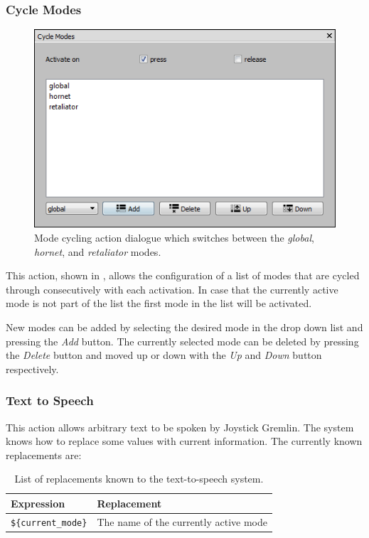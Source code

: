 \documentclass[a4, 10pt]{article}
\newcommand{\JG}{Joystick Gremlin}
\begin{document}
\subsubsection{Cycle Modes}

\begin{figure}[bt]
    \centering

    \includegraphics[width=0.75\linewidth]{images/action_cycle_modes}
    \caption{Mode cycling action dialogue which switches between the
        \emph{global}, \emph{hornet}, and \emph{retaliator} modes.}
    \label{fig:action_cycle_modes}
\end{figure}

This action, shown in , allows the
configuration of a list of modes that are cycled through consecutively
with each activation. In case that the currently active mode is not part
of the list the first mode in the list will be activated.

New modes can be added by selecting the desired mode in the drop down
list and pressing the \emph{Add} button. The currently selected mode can
be deleted by pressing the \emph{Delete} button and moved up or down
with the \emph{Up} and \emph{Down} button respectively.


\subsubsection{Text to Speech}

This action allows arbitrary text to be spoken by \JG{}. The system
knows how to replace some values with current information. The currently
known replacements are:

\begin{table}[h]
    \centering

    \begin{tabular}{ll}
        \toprule
        Expression & Replacement \\
        \midrule
        \verb+${current_mode}+ & The name of the currently active mode \\
        \bottomrule
    \end{tabular}

    \caption{List of replacements known to the text-to-speech system.}
\end{table}
\end{document}
